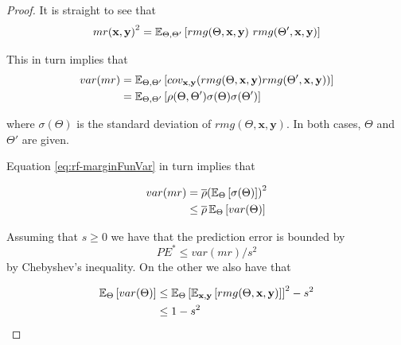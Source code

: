 \begin{appendices}
\begin{proof}
	
	It is straight to see that
	\begin{equation}
	{mr( \textbf{x},\textbf{y} )}^2 = \Expect_{\Theta, \Theta'} \left[ rmg( \Theta,\textbf{x},\textbf{y} ) \ rmg(\Theta',\textbf{x},\textbf{y} ) \right]
	\end{equation}
	
	
	This in turn implies that
	\begin{equation}\label{eq:rf-marginFunVar}
	\begin{split}
	var(mr) & = \operatorname{\mathbb{E}}_{\Theta, \Theta'}
	\left[
	cov_{\textbf{x},\textbf{y}}
	(rmg(\Theta,\textbf{x},\textbf{y} )rmg(\Theta',\textbf{x},\textbf{y} ))
	\right] \\
	& = \operatorname{\mathbb{E}}_{\Theta, \Theta'}
	\left[
	\rho(\Theta, \Theta')\sigma(\Theta)\sigma(\Theta')
	\right]
	\end{split}
	\end{equation}
	
	where $\sigma(\Theta)$ is the standard deviation of $rmg(\Theta,\textbf{x},\textbf{y})$.
	In both cases, $\Theta$ and $\Theta'$ are given.%
	
	Equation \cref{eq:rf-marginFunVar} in turn implies that
	
	\begin{equation}\label{eq:rf-varianceBound}
	\begin{split}
	var(mr) & = \overline{\rho} {(\operatorname{\mathbb{E}}_{\Theta}\left[ \sigma(\Theta)\right] )}^2 \\
	& \leq \overline{\rho} \operatorname{\mathbb{E}}_{\Theta} \left[ var(\Theta) \right]
	\end{split}
	\end{equation}
	
	
	Assuming that $s \geq 0$ we have that the prediction error is bounded by
	\begin{equation}\label{eq:rf-predictiveErrorBound1}
	PE^* \leq var(mr)/s^2
	\end{equation}
	by Chebyshev's inequality.
	On the other we also have that
	
	\begin{equation}\label{eq:rf-expectedVarBound}
	\begin{split}
	\operatorname{\mathbb{E}}_{\Theta} \left[ var(\Theta) \right] & \leq \operatorname{\mathbb{E}}_{\Theta} {\left[ \operatorname{\mathbb{E}}_{\textbf{x},\textbf{y}}\left[ rmg(\Theta,\textbf{x},\textbf{y})  \right] \right]}^2 -s^2 \\
	& \leq 1-s^2
	\end{split}
	\end{equation}
	

\end{proof}
\end{appendices}
